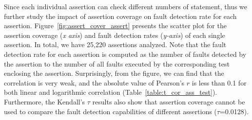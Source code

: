 \begin{comment}
\begin{table}[h] 
\centering 
\tiny
\caption{} 
\label{} 
\begin{tabular}{@{\extracolsep{5pt}}lcc} \\
[-1.8ex]\hline \hline \\
[-1.8ex] & \multicolumn{2}{c}{\textit{Dependent variable:}} \\ 
\cline{2-3} \\
[-1.8ex] & Count Model & Hurdle Model\\ 
\hline \\
[-1.8ex] assertion & 0.034$^{***}$(0.003) & 0.360$^{***}$(0.066)\\ 
statement & 0.0003$^{***}$(0.0001) & 0.020$^{***}$(0.0040)\\ 
all\_mutant & 0.002$^{***}$(0.00004) & $-$0.002(0.002)\\ 
Constant & 3.478$^{***}$(0.015) & 2.204$^{***}$(0.098) \\ 
\hline \\
[-1.8ex] Observations && 11,245 \\ 
Log Likelihood && $-$60,141.340 \\ 
\hline \\
[-1.8ex] 
\textit{Note:}  & \multicolumn{1}{r}{$^{*}$p$<$0.1; $^{**}$p$<$0.05; $^{***}$p$<$0.01} \\ 
\hline \\
\end{tabular} 
\end{table} 
\end{comment}

Since each individual assertion can check different numbers of
statement, thus we further study the impact of assertion coverage on
fault detection rate for each
assertion. Figure~\ref{fig:assert_cover_assert} presents the scatter
plot for the assertion coverage ({\em x axis}) and fault detection
rates ({\em y-axis}) of each single assertion. In total, we have
25,220 assertions analyzed. Note that the
fault detection rate for each assertion is computed as the number of
faults detected by the assertion to the number of all faults executed
by the corresponding test enclosing the assertion. Surprisingly, from
the figure, we can find that the correlation is very weak, and
the absolute value of Pearson's $r$ is less than 0.1 for both linear and logarithmic
correlation (Table~\ref{table:t_cor_ass_test}). Furthermore, the
Kendall's $\tau$ results also show that assertion coverage cannot be
used to compare the fault detection capabilities of different
assertions ($\tau$=0.0128).

